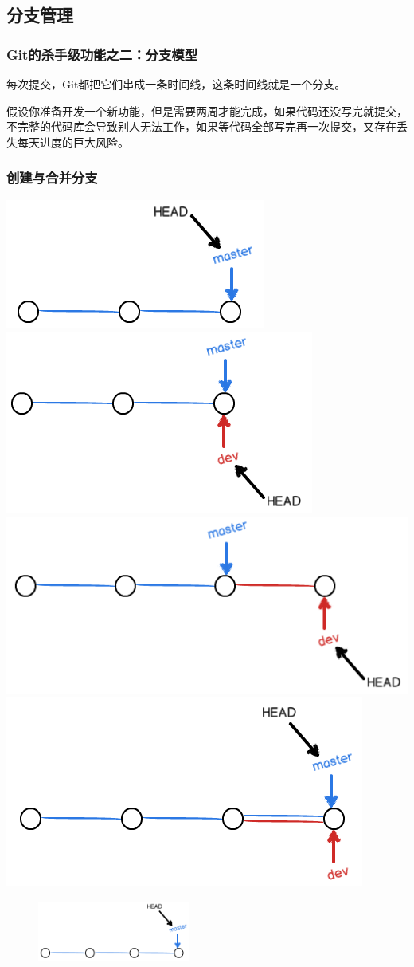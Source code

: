 \documentclass[notheorems,mathserif,table,compress]{beamer}  %
\newcommand\zhushadow[2][purple]{\hskip5pt\shadowbox{\color{#1}\small\kai #2\vspace{3mm}}}
\begin{document}
\subsection{分支管理}

\begin{frame}
  \frametitle{Git的杀手级功能之二：分支模型}
  \zhushadow{分支} 每次提交，Git都把它们串成一条时间线，这条时间线就是一个分支。

  \zhushadow{应用场景} 假设你准备开发一个新功能，但是需要两周才能完成，如果代码还没写完就提交，不完整的代码库会导致别人无法工作，如果等代码全部写完再一次提交，又存在丢失每天进度的巨大风险。
\end{frame}


\begin{frame}
  \frametitle{创建与合并分支}
  \begin{center}
  \includegraphics[width=0.24\linewidth]{1.png}
  \hspace{0.3em}
  \includegraphics[width=0.24\linewidth]{2.png}
  \hspace{0.3em}
  \includegraphics[width=0.24\linewidth]{3.png}
  \hspace{0.3em}
  \includegraphics[width=0.24\linewidth]{4.png}
  \end{center}
  \begin{figure}[h]
  \centering
  \centerline{\includegraphics[width=5cm]{5.png}}
  \end{figure}
\end{frame}
\end{document}
